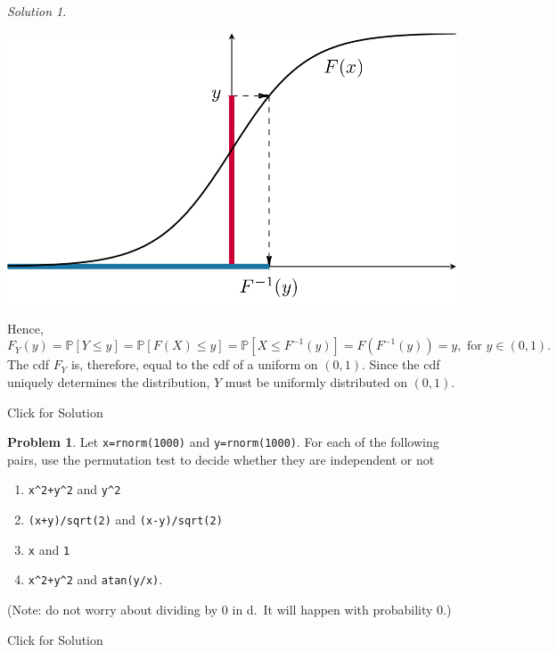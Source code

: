 \documentclass[
]{book}
\providecommand{\tightlist}{%
  \setlength{\itemsep}{0pt}\setlength{\parskip}{0pt}}
\theoremstyle{definition}
\theoremstyle{definition}
\theoremstyle{definition}
\newtheorem{exercise}{Problem}[chapter]
\theoremstyle{definition}
\theoremstyle{remark}
\newtheorem*{solution}{Solution}
\begin{document}
\begin{solution}
\begin{center}\includegraphics[width=0.6\linewidth,style="padding:10px"]{pics/cdf_plot} \end{center}

Hence, \[F_Y(y)={\mathbb{P}}[Y\leq y] = {\mathbb{P}}[ F(X) \leq y] = {\mathbb{P}}[ X \leq F^{-1}(y) ] = F(F^{-1}(y)) = y, 
\text{ for } y\in (0,1).\] The cdf \(F_Y\) is, therefore, equal to the cdf
of a uniform on \((0,1)\).
Since the cdf uniquely determines the distribution, \(Y\) must be uniformly
distributed on \((0,1)\).
\end{solution}

Click for Solution

\begin{exercise}
Let \texttt{x=rnorm(1000)} and \texttt{y=rnorm(1000)}. For each of the following pairs, use the permutation test to decide whether they are independent or not

\begin{enumerate}
\def\labelenumi{\alph{enumi})}
\tightlist
\item
  \texttt{x\^{}2+y\^{}2} and \texttt{y\^{}2}
\item
  \texttt{(x+y)/sqrt(2)} and \texttt{(x-y)/sqrt(2)}
\item
  \texttt{x} and \texttt{1}
\item
  \texttt{x\^{}2+y\^{}2} and \texttt{atan(y/x)}.
\end{enumerate}

(Note: do not worry about dividing by \(0\) in d.~It will happen with probability \(0\).)
\end{exercise}

Click for Solution
\end{document}

